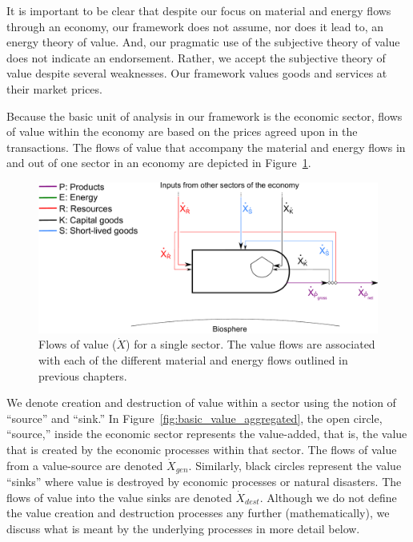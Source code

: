 It is important to be clear that 
despite our focus on material and energy flows through an economy, 
our framework does not assume, nor does it lead to, 
an energy theory of value.
And, our pragmatic use of the subjective theory of value
does not indicate an endorsement. 
Rather, we accept the subjective theory of value
despite several weaknesses.
Our framework values goods and services at their market prices.

Because the basic unit of analysis in our framework is the economic sector, 
flows of value within the economy are based on the prices agreed 
upon in the transactions. 
The flows of value that accompany the material and energy flows in and out 
of one sector in an economy are depicted in Figure~\ref{fig:basic_value}. 

\begin{figure}[!ht]
\centering
\includegraphics[width=0.8\linewidth]{Part_2/Chapter_Values/images/PERKS_basic_unit_value_all.pdf}
\caption[Flows of value for a single sector]{Flows of value ($\dot{X}$) 
for a single sector. 
The value flows are associated with each of the different 
material and energy flows outlined in previous chapters.}
\label{fig:basic_value} 
\end{figure}

We denote creation and destruction
of value within a sector using the notion of ``source'' and ``sink.''
In Figure~\ref{fig:basic_value_aggregated}, the open circle, 
``source,'' inside the economic sector represents the value-added,
that is, the value that is created by the economic processes within that sector. 
The flows of value from a value-source are denoted $\dot{X}_{gen}$. 
Similarly, black circles represent the value ``sinks''  where value is destroyed 
by economic  processes or natural disasters. 
The flows of value into the value sinks are denoted $\dot{X}_{dest}$. 
Although we do not define 
the value creation and destruction processes any further (mathematically), 
we discuss what is meant by the
underlying processes in more detail below.

